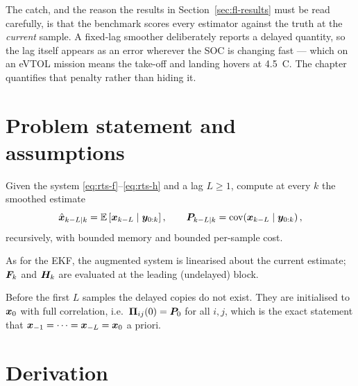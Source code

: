 The catch, and the reason the results in Section~\ref{sec:fl-results} must be read carefully, is
that the benchmark scores every estimator against the truth at the \emph{current} sample.  A
fixed-lag smoother deliberately reports a delayed quantity, so the lag itself appears as an error
wherever the SOC is changing fast --- which on an eVTOL mission means the take-off and landing
hovers at \SI{4.5}{C}.  The chapter quantifies that penalty rather than hiding it.

\section{Problem statement and assumptions}
Given the system \eqref{eq:rts-f}--\eqref{eq:rts-h} and a lag $L\ge1$, compute at every $k$ the
smoothed estimate
\begin{equation}
\hat{\bm{x}}_{k-L\mid k}=\mathbb{E}\left[\bm{x}_{k-L}\mid\bm{y}_{0:k}\right],\qquad
\bm{P}_{k-L\mid k}=\operatorname{cov}\!\left(\bm{x}_{k-L}\mid\bm{y}_{0:k}\right),
\label{eq:fl-goal}
\end{equation}
recursively, with bounded memory and bounded per-sample cost.

\begin{assumption}[Linearisation]\label{as:fl-lin}
As for the EKF, the augmented system is linearised about the current estimate; $\bm{F}_k$ and $\bm{H}_k$
are evaluated at the leading (undelayed) block.
\end{assumption}

\begin{assumption}\label{as:fl-init}
Before the first $L$ samples the delayed copies do not exist.  They are initialised to
$\bm{x}_0$ with full correlation, i.e.\ $\bm{\Pi}_{ij}(0)=\bm{P}_0$ for all $i,j$, which is the exact
statement that $\bm{x}_{-1}=\dots=\bm{x}_{-L}=\bm{x}_0$ a priori.
\end{assumption}

\section{Derivation}

